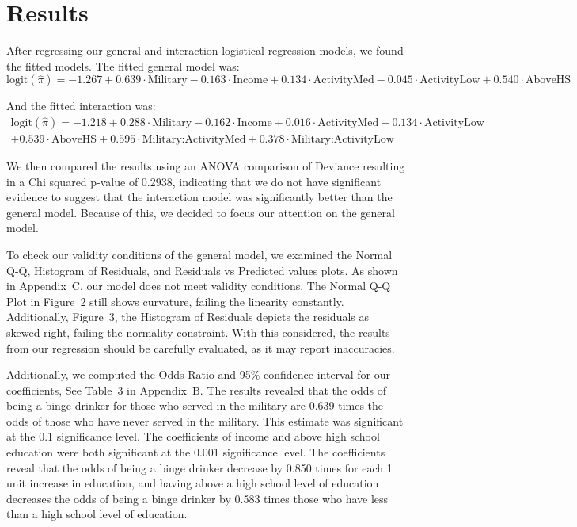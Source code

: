\documentclass[12pt]{article}
\begin{document}
\section{Results}

After regressing our general and interaction logistical regression models, we found the fitted models. The fitted general model was:
\begin{equation}
\text{logit}(\hat{\pi}) = -1.267 + 0.639 \cdot \text{Military} - 0.163 \cdot \text{Income} + 0.134 \cdot \text{ActivityMed} - 0.045 \cdot \text{ActivityLow} + 0.540 \cdot \text{AboveHS}
\end{equation}

And the fitted interaction was:
\begin{multline}
\text{logit}(\hat{\pi}) = -1.218 + 0.288 \cdot \text{Military} - 0.162 \cdot \text{Income} + 0.016 \cdot \text{ActivityMed} - 0.134 \cdot \text{ActivityLow} \\
+ 0.539 \cdot \text{AboveHS} + 0.595 \cdot \text{Military:ActivityMed} + 0.378 \cdot \text{Military:ActivityLow}
\end{multline}

We then compared the results using an ANOVA comparison of Deviance resulting in a Chi squared p-value of 0.2938, indicating that we do not have significant evidence to suggest that the interaction model was significantly better than the general model. Because of this, we decided to focus our attention on the general model.

To check our validity conditions of the general model, we examined the Normal Q-Q, Histogram of Residuals, and Residuals vs Predicted values plots. As shown in Appendix~C, our model does not meet validity conditions. The Normal Q-Q Plot in Figure~2 still shows curvature, failing the linearity constantly. Additionally, Figure~3, the Histogram of Residuals depicts the residuals as skewed right, failing the normality constraint. With this considered, the results from our regression should be carefully evaluated, as it may report inaccuracies.

Additionally, we computed the Odds Ratio and 95\% confidence interval for our coefficients, See Table~3 in Appendix~B. The results revealed that the odds of being a binge drinker for those who served in the military are 0.639 times the odds of those who have never served in the military. This estimate was significant at the 0.1 significance level. The coefficients of income and above high school education were both significant at the 0.001 significance level. The coefficients reveal that the odds of being a binge drinker decrease by 0.850 times for each 1 unit increase in education, and having above a high school level of education decreases the odds of being a binge drinker by 0.583 times those who have less than a high school level of education.
\end{document}
